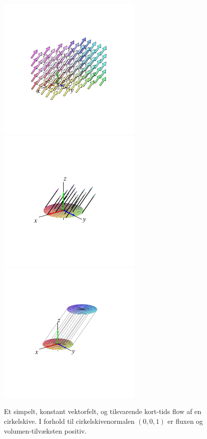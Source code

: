 \begin{figure}[ht]
\centerline{\includegraphics[width=70mm]{FIGS/plotSkiveFlowA1}\includegraphics[width=70mm]{FIGS/plotSkiveFlowA3}\includegraphics[width=70mm]{FIGS/plotSkiveFlowA2}}
\begin{center}
\caption{\small{Et simpelt, konstant vektorfelt, og tilsvarende kort-tids flow af en cirkelskive. I forhold til cirkelskivenormalen $(0,0,1)$ er fluxen og volumen-tilvæksten positiv. }} \label{figSkiveFlowA}
\end{center}
\end{figure}


